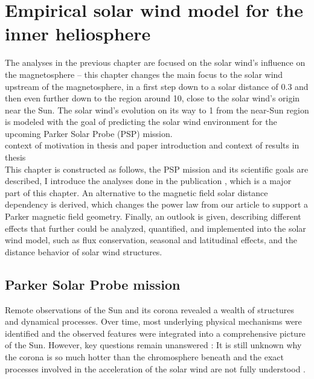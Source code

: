 
\chapter{Empirical solar wind model for the inner heliosphere}
\label{chap:empirical_solar_wind_model_for_the_inner_heliosphere}

The analyses in the previous chapter are focused on the solar wind's influence on the magnetosphere -- this chapter changes the main focus to the solar wind upstream of the magnetosphere, in a first step down to a solar distance of \SI{0.3}{\au} and then even further down to the region around \SI{10}{\Rs}, close to the solar wind's origin near the Sun. The solar wind's evolution on its way to \SI{1}{\au} from the near-Sun region is modeled with the goal of predicting the solar wind environment for the upcoming Parker Solar Probe (PSP) mission.\\

context of motivation in thesis and paper introduction and context of results in thesis\\

This chapter is constructed as follows, the PSP mission and its scientific goals are described, I introduce the analyses done in the publication \citet{Venzmer2018}, which is a major part of this chapter. An alternative to the magnetic field solar distance dependency is derived, which changes the power law from our article to support a Parker magnetic field geometry. Finally, an outlook is given, describing different effects that further could be analyzed, quantified, and implemented into the solar wind model, such as flux conservation, seasonal and latitudinal effects, and the distance behavior of solar wind structures.


\section{Parker Solar Probe mission}
Remote observations of the Sun and its corona revealed a wealth of structures and dynamical processes. Over time, most underlying physical mechanisms were identified and the observed features were integrated into a comprehensive picture of the Sun. However, key questions remain unanswered \citep{McComas2007}: It is still unknown why the corona is so much hotter than the chromosphere beneath \citep{Klimchuk2006} and the exact processes involved in the acceleration of the solar wind are not fully understood \citep{Hollweg1985,Cranmer2017}.


